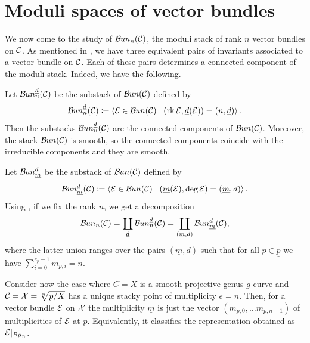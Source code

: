 \section{Moduli spaces of vector bundles}\label{section: moduli spaces of vector bundles}

We now come to the study of $\mathcal{B}\kern -.5pt un_n(\mathcal{C})$, the moduli stack of rank $n$ vector bundles on $\mathcal{C}$.
As mentioned in , we have three equivalent pairs of invariants associated to a vector bundle on $\mathcal{C}$. Each of these pairs determines a connected component of the moduli stack. Indeed, we have the following.

\begin{thm}\cite[Corollary 2.0.9, Theorem 2.0.10]{Taams} \label{connected components of the moduli stack}
Let $\mathcal{B}\kern -.5pt un_{n}^{\underline{d}}(\mathcal{C})$ be the substack of $\mathcal{B}\kern -.5pt un(\mathcal{C})$ defined by
\begin{equation}
\mathcal{B}\kern -.5pt un_{n}^{\underline{d}}(\mathcal{C}) \coloneqq \left< \mathcal{E} \in \mathcal{B}\kern -.5pt un(\mathcal{C}) \;\middle|\; (\operatorname{rk} \mathcal{E}, \underline{d}(\mathcal{E})) = (n, \underline{d})\right>.
\end{equation}
Then the substacks $\mathcal{B}\kern -.5pt un_{n}^{\underline{d}}(\mathcal{C})$ are the connected components of $\mathcal{B}\kern -.5pt un(\mathcal{C})$. Moreover, the stack $\mathcal{B}\kern -.5pt un(\mathcal{C})$ is smooth, so the connected components coincide with the irreducible components and they are smooth.
\end{thm}

Let $\mathcal{B}\kern -.5pt un_{\underline{m}}^d$ be the substack of $\mathcal{B}\kern -.5pt un(\mathcal{C})$ defined by
\begin{equation}
\mathcal{B}\kern -.5pt un^{d}_{\underline{m}}(\mathcal{C}) \coloneqq \left< \mathcal{E} \in \mathcal{B}\kern -.5pt un(\mathcal{C}) \;\middle|\; (\underline{m}(\mathcal{E}), \deg \mathcal{E}) = (\underline{m}, d)\right>.
\end{equation}
Using , if we fix the rank $n$, we get a decomposition
\[
\mathcal{B}\kern -.5pt un_n(\mathcal{C}) = \coprod_{\underline{d}} \mathcal{B}\kern -.5pt un_{n}^{\underline{d}}(\mathcal{C}) = \coprod_{(\underline{m}, d)} \mathcal{B}\kern -.5pt un_{\underline{m}}^d (\mathcal{C}),
\]
where the latter union ranges over the pairs $(\underline{m}, d)$ such that for all $p \in \underline{p}$ we have $\sum_{i=0}^{e_p-1}m_{p, i} = n$.

Consider now the case where $C = X$ is a smooth projective genus $g$ curve and $\mathcal{C} = \mathcal{X} = \sqrt[n]{p / X}$ has a unique stacky point of multiplicity $e = n$. Then, for a vector bundle $\mathcal{E} $ on $\mathcal{X}$ the multiplicity $\underline{m}$ is just the vector $(m_{p, 0}, \dots m_{p, n-1})$ of multiplicities of $\mathcal{E}$ at $p$. Equivalently, it classifies the representation obtained as $\mathcal{E}\vert_{B \mu_n}$.

